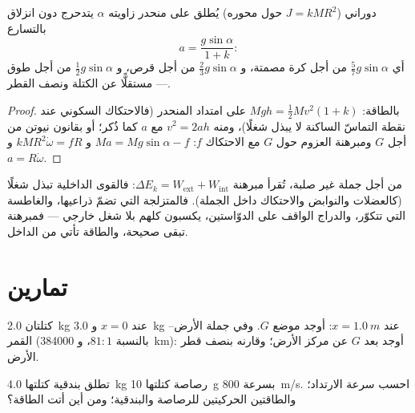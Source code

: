 \begin{proposition}\label{prop:b1:systems-of-points:rollingincline}
 دوراني ($J = kMR^2$ حول محوره) يُطلق على
منحدر زاويته $\alpha$ يتدحرج دون انزلاق بالتسارع
\[
a = \frac{g\sin\alpha}{1 + k} :
\]
أي $\tfrac57 g\sin\alpha$ من أجل كرة مصمتة، و $\tfrac23 g\sin\alpha$ من أجل قرص،
و $\tfrac12 g\sin\alpha$ من أجل طوق --- مستقلًّا عن الكتلة ونصف القطر.
\end{proposition}

\begin{proof}
بالطاقة: $Mgh = \tfrac12 Mv^2(1 + k)$ على امتداد المنحدر (فالاحتكاك السكوني
عند نقطة التماسّ الساكنة لا يبذل شغلًا)، ومنه $v^2 = 2ah$ مع $a$ كما
ذُكر؛ أو بقانون نيوتن من أجل $G$ ومبرهنة العزوم حول $G$ مع
الاحتكاك $f$: $Ma = Mg\sin\alpha - f$ و $kMR^2\dot\omega = fR$ و $a = R\dot\omega$.
\end{proof}

\begin{remark}\label{rem:b1:systems-of-points:deformable}
من أجل جملة غير صلبة، تُقرأ مبرهنة 
$\Delta E_k = W_{\mathrm{ext}} + W_{\mathrm{int}}$: فالقوى الداخلية تبذل
شغلًا (كالعضلات والنوابض والاحتكاك داخل الجملة). فالمتزلجة التي تضمّ
ذراعيها، والغاطسة التي تتكوّر، والدراج الواقف على الدوّاستين، يكسبون كلهم
 بلا شغل خارجي --- فمبرهنة 
تبقى صحيحة، والطاقة تأتي من الداخل.
\end{remark}

\section{تمارين}

\begin{exercise}[$\star$]\label{exo:b1:systems-of-points:1}
كتلتان \qty{2.0}{kg} عند $x = 0$ و \qty{3.0}{kg} عند $x = \qty{1.0}{m}$:
أوجد موضع $G$. وفي جملة الأرض--القمر (بالنسبة $81:1$، و \qty{384000}{km}):
أوجد بعد $G$ عن مركز الأرض؛ وقارنه بنصف قطر
الأرض.
\end{exercise}

\begin{exercise}[$\star$]\label{exo:b1:systems-of-points:2}
تطلق بندقية كتلتها \qty{4.0}{kg} رصاصة كتلتها \qty{10}{g} بسرعة \qty{800}{m/s}.
احسب سرعة الارتداد؛ والطاقتين الحركيتين للرصاصة والبندقية؛ ومن أين أتت
الطاقة؟
\end{exercise}

